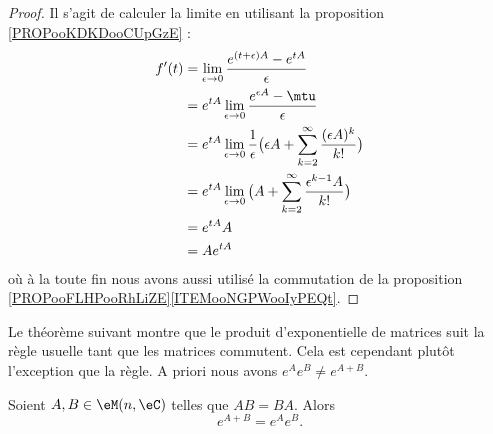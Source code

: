 \begin{proof}
    Il s'agit de calculer la limite en utilisant la proposition \ref{PROPooKDKDooCUpGzE} :
    \begin{subequations}
        \begin{align}
            f'(t)&=\lim_{\epsilon\to 0}\frac{  e^{(t+\epsilon)A}- e^{tA} }{ \epsilon }\\
            &= e^{tA}\lim_{\epsilon\to 0}\frac{  e^{\epsilon A}-\mtu }{ \epsilon }\\
            &= e^{tA}\lim_{\epsilon\to 0}\frac{1}{ \epsilon }\big( \epsilon A+\sum_{k=2}^{\infty}\frac{ (\epsilon A)^k }{ k! } \big)\\
            &= e^{tA}\lim_{\epsilon\to 0}\big( A+\sum_{k=2}^{\infty}\frac{ \epsilon^{k-1}A }{ k! } \big)\\
            &=  e^{tA}A\\
            &= A e^{tA}
        \end{align}
    \end{subequations}
    où à la toute fin nous avons aussi utilisé la commutation de la proposition \ref{PROPooFLHPooRhLiZE}\ref{ITEMooNGPWooIyPEQt}.
\end{proof}

Le théorème suivant montre que le produit d'exponentielle de matrices suit la règle usuelle tant que les matrices commutent. Cela est cependant plutôt l'exception que la règle. A priori nous avons \(  e^{A} e^{B}\neq  e^{A+B}\).
\begin{theorem}       \label{THOooXCPEooYGyLOp}
    Soient \( A,B\in \eM(n,\eC)\) telles que \( AB=BA\). Alors
    \begin{equation}
        e^{A+B}= e^{A} e^{B}.
    \end{equation}
\end{theorem}

